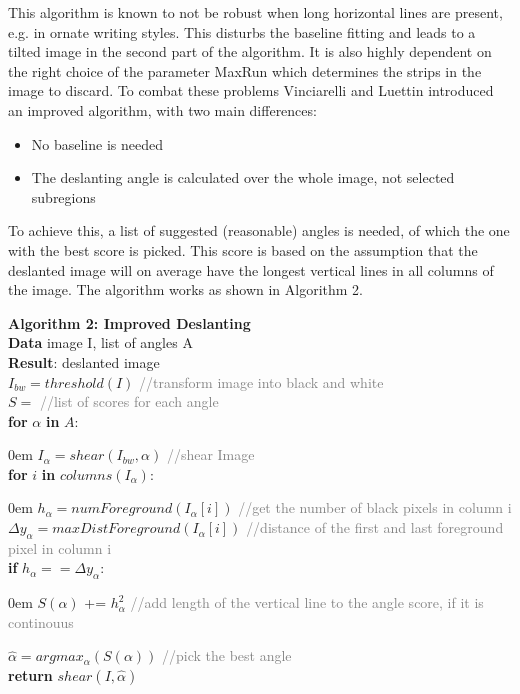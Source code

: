 \documentclass{article}
\begin{document}
This algorithm is known to not be robust when long horizontal lines are present, e.g. in ornate writing styles. This disturbs the baseline fitting and leads to a tilted image in the second part of the algorithm. It is also highly dependent on the right choice of the parameter MaxRun which determines the strips in the image to discard.
To combat these problems Vinciarelli and Luettin \cite{Vinciarelli} introduced an improved algorithm, with two main differences:
\begin{itemize}
\item No baseline is needed
\item The deslanting angle is calculated over the whole image, not selected subregions
\end{itemize}
To achieve this, a list of suggested (reasonable) angles is needed, of which the one with the best score is picked. This score is based on the assumption that the deslanted image will on average have the longest vertical lines in all columns of the image.
The algorithm works as shown in Algorithm 2.

\begin{algorithm}	
\textbf{Algorithm 2: Improved Deslanting} \\
\textbf{Data} image I, list of angles A \\
\textbf{Result}: deslanted image \\
$I_{bw} = threshold(I)$ \textcolor{gray}{//transform image into black and white} \\
$S = {}$ \textcolor{gray}{//list of scores for each angle} \\
\textbf{for} $\alpha$ \textbf{in} $A$:
\begin{addmargin}[1em] {0em}%
$I_{\alpha} = shear(I_{bw}, \alpha)$ \textcolor{gray}{//shear Image} \\
\textbf{for} $i$ \textbf{in} $columns(I_{\alpha})$:
\begin{addmargin}[1em] {0em}%
$h_{\alpha} = numForeground(I_{\alpha}[i])$ \textcolor{gray}{//get the number of black pixels in column i} \\
$\Delta y_{\alpha} = maxDistForeground(I_{\alpha}[i])$ \textcolor{gray}{//distance of the first and last foreground pixel in column i} \\
\textbf{if} $h_{\alpha} == \Delta y_{\alpha}$:
\begin{addmargin}[1em] {0em}%
$S(\alpha)$ += $h_{\alpha}^2$ \textcolor{gray}{//add length of the vertical line to the angle score, if it is continouus}
\end{addmargin}
\end{addmargin}
\end{addmargin}
$\hat{\alpha} = argmax_{\alpha}(S(\alpha))$ \textcolor{gray}{//pick the best angle} \\
\textbf{return} $shear(I, \hat{\alpha})$  
\end{algorithm}
\end{document}
